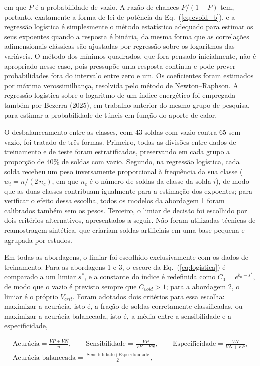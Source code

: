 \documentclass[12pt,openany]{report}
\begin{document}
\noindent em que $P$ é a probabilidade de vazio. A razão de chances $P/(1-P)$ tem, portanto, exatamente a forma de lei de potência da Eq.~(\ref{eq:cvoid_b}), e a regressão logística é simplesmente o método estatístico adequado para estimar os seus expoentes quando a resposta é binária, da mesma forma que as correlações adimensionais clássicas são ajustadas por regressão sobre os logaritmos das variáveis. O método dos mínimos quadrados, que fora pensado inicialmente, não é apropriado nesse caso, pois pressupõe uma resposta contínua e pode prever probabilidades fora do intervalo entre zero e um. Os coeficientes foram estimados por máxima verossimilhança, resolvida pelo método de Newton--Raphson. A regressão logística sobre o logaritmo de um índice energético foi empregada também por Bezerra (2025), em trabalho anterior do mesmo grupo de pesquisa, para estimar a probabilidade de túneis em função do aporte de calor.

O desbalanceamento entre as classes, com 43 soldas com vazio contra 65 sem vazio, foi tratado de três formas. Primeiro, todas as divisões entre dados de treinamento e de teste foram estratificadas, preservando em cada grupo a proporção de 40\% de soldas com vazio. Segundo, na regressão logística, cada solda recebeu um peso inversamente proporcional à frequência da sua classe ($w_i = n/(2\,n_{c})$, em que $n_{c}$ é o número de soldas da classe da solda $i$), de modo que as duas classes contribuam igualmente para a estimação dos expoentes; para verificar o efeito dessa escolha, todos os modelos da abordagem 1 foram calibrados também sem os pesos. Terceiro, o limiar de decisão foi escolhido por dois critérios alternativos, apresentados a seguir. Não foram utilizadas técnicas de reamostragem sintética, que criariam soldas artificiais em uma base pequena e agrupada por estudos.

Em todas as abordagens, o limiar foi escolhido exclusivamente com os dados de treinamento. Para as abordagens 1 e 3, o escore da Eq.~(\ref{eq:logistica}) é comparado a um limiar $s^{*}$, e a constante do índice é redefinida como $C_0 = e^{b_0 - s^{*}}$, de modo que o vazio é previsto sempre que $C_{void} > 1$; para a abordagem 2, o limiar é o próprio $V_{crit}$. Foram adotados dois critérios para essa escolha: maximizar a acurácia, isto é, a fração de soldas corretamente classificadas, ou maximizar a acurácia balanceada, isto é, a média entre a sensibilidade e a especificidade,

\begin{equation}
\begin{gathered}
\text{Acurácia} = \frac{VP + VN}{n}, \qquad \text{Sensibilidade} = \frac{VP}{VP + FN}, \qquad \text{Especificidade} = \frac{VN}{VN + FP}, \\[4pt]
\text{Acurácia balanceada} = \frac{\text{Sensibilidade} + \text{Especificidade}}{2},
\end{gathered}
\label{eq:metricas}
\end{equation}
\end{document}
